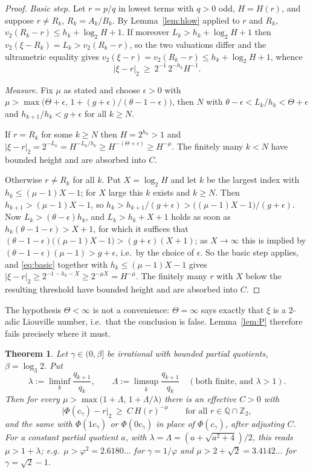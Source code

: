 \documentclass[11pt,reqno]{amsart}
\theoremstyle{plain}
\newtheorem{theorem}{Theorem}[section]
\theoremstyle{definition}
\newcommand{\Z}{\mathbb{Z}}
\newcommand{\Q}{\mathbb{Q}}
\newcommand{\Zt}{\Z_2}
\newcommand{\PH}{\Phi}
\newcommand{\vtwo}{v_2}
\begin{document}
\begin{proof}
\emph{Basic step.} Let $r=p/q$ in lowest terms with $q>0$ odd, $H=H(r)$, and suppose $r\ne R_k$,
$R_k=A_k/B_k$. By Lemma~\ref{lem:hlow} applied to $r$ and $R_k$,
$\vtwo(R_k-r)\le h_k+\log_2 H+1$. If moreover $L_k>h_k+\log_2 H+1$ then
$\vtwo(\xi-R_k)=L_k>\vtwo(R_k-r)$, so the two valuations differ and the ultrametric equality gives
$\vtwo(\xi-r)=\vtwo(R_k-r)\le h_k+\log_2 H+1$, whence
\begin{equation}\label{eq:basic}
  |\xi-r|_2\ \ge\ 2^{-1}\,2^{-h_k}H^{-1}.
\end{equation}

\emph{Measure.} Fix $\mu$ as stated and choose $\epsilon>0$ with
$\mu>\max\bigl(\Theta+\epsilon,\,1+(g+\epsilon)/(\theta-1-\epsilon)\bigr)$, then $N$ with
$\theta-\epsilon<L_k/h_k<\Theta+\epsilon$ and $h_{k+1}/h_k<g+\epsilon$ for all $k\ge N$.

If $r=R_k$ for some $k\ge N$ then $H=2^{h_k}>1$ and
$|\xi-r|_2=2^{-L_k}=H^{-L_k/h_k}\ge H^{-(\Theta+\epsilon)}\ge H^{-\mu}$. The finitely many $k<N$
have bounded height and are absorbed into $C$.

Otherwise $r\ne R_k$ for all $k$. Put $X=\log_2 H$ and let $k$ be the largest index with
$h_k\le(\mu-1)X-1$; for $X$ large this $k$ exists and $k\ge N$. Then $h_{k+1}>(\mu-1)X-1$, so
$h_k>h_{k+1}/(g+\epsilon)>\bigl((\mu-1)X-1\bigr)/(g+\epsilon)$. Now
$L_k>(\theta-\epsilon)h_k$, and $L_k>h_k+X+1$ holds as soon as
$h_k(\theta-1-\epsilon)>X+1$, for which it suffices that
$(\theta-1-\epsilon)\bigl((\mu-1)X-1\bigr)>(g+\epsilon)(X+1)$; as $X\to\infty$ this is implied by
$(\theta-1-\epsilon)(\mu-1)>g+\epsilon$, i.e.\ by the choice of $\epsilon$. So the basic step
applies, and \eqref{eq:basic} together with $h_k\le(\mu-1)X-1$ gives
$|\xi-r|_2\ge2^{-1-h_k-X}\ge2^{-\mu X}=H^{-\mu}$. The finitely many $r$ with $X$ below the
resulting threshold have bounded height and are absorbed into $C$.
\end{proof}

The hypothesis $\Theta<\infty$ is not a convenience: $\Theta=\infty$ says exactly that $\xi$ is a
$2$-adic Liouville number, i.e.\ that the conclusion is false. Lemma~\ref{lem:P} therefore fails
precisely where it must.

\begin{theorem}\label{thm:Bstar}
Let $\gamma\in(0,\beta]$ be irrational with bounded partial quotients, $\beta=\log_3 2$. Put
\[
  \lambda:=\liminf_k\frac{q_{k+1}}{q_k},\qquad \Lambda:=\limsup_k\frac{q_{k+1}}{q_k}
  \quad(\text{both finite, and }\lambda>1).
\]
Then for every $\mu>\max\bigl(1+\Lambda,\,1+\Lambda/\lambda\bigr)$ there is an effective $C>0$ with
\[
  \bigl|\PH(c_\gamma)-r\bigr|_2\ \ge\ C\,H(r)^{-\mu}\qquad\text{for all }r\in\Q\cap\Zt,
\]
and the same with $\PH(1c_\gamma)$ or $\PH(0c_\gamma)$ in place of $\PH(c_\gamma)$, after adjusting
$C$. For a constant partial quotient $a$, with $\lambda=\Lambda=(a+\sqrt{a^{2}+4})/2$, this reads
$\mu>1+\lambda$; e.g.\ $\mu>\varphi^{2}=2.6180\ldots$ for $\gamma=1/\varphi$ and
$\mu>2+\sqrt2=3.4142\ldots$ for $\gamma=\sqrt2-1$.
\end{theorem}
\end{document}
